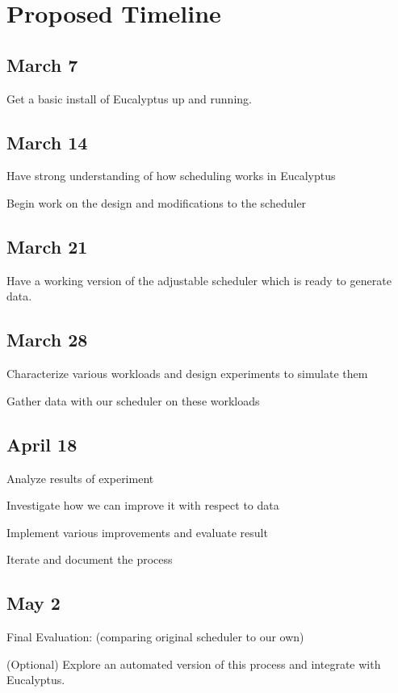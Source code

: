 \section{Proposed Timeline}
\subsection{March 7}
\begin{itemize*}
  \item Get a basic install of Eucalyptus up and running.
\end{itemize*}
\subsection{March 14}
\begin{itemize*}
  \item Have strong understanding of how scheduling works in Eucalyptus
  \item Begin work on the design and modifications to the scheduler
\end{itemize*}
\subsection{March 21}
\begin{itemize*}
  \item Have a working version of the adjustable scheduler which is ready to generate data.
\end{itemize*}
\subsection{March 28}
\begin{itemize*}
  \item Characterize various workloads and design experiments to simulate them
  \item Gather data with our scheduler on these workloads
\end{itemize*}
\subsection{April 18}
\begin{itemize*}
  \item Analyze results of experiment
  \item Investigate how we can improve it with respect to data
  \item Implement various improvements and evaluate result
  \item Iterate and document the process
\end{itemize*}
\subsection{May 2}
\begin{itemize*}
  \item Final Evaluation: (comparing original scheduler to our own)
  \item (Optional) Explore an automated version of this process and integrate with Eucalyptus.
\end{itemize*}

